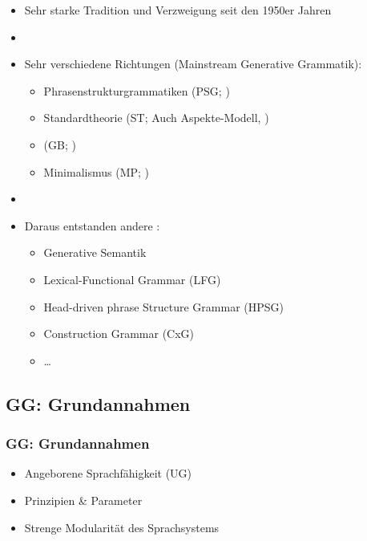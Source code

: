\begin{frame}

\begin{itemize}
	\item Sehr starke Tradition und Verzweigung seit den 1950er Jahren
	\item[]
	\item Sehr verschiedene Richtungen (Mainstream Generative Grammatik):
	\begin{itemize}
		\item Phrasenstrukturgrammatiken (PSG; \citealt{Chomsky57x})
		\item Standardtheorie (ST; Auch Aspekte-Modell, \citealt{Chomsky65a})
		\item {} (GB; \citealt{Chomsky81x})
		\item Minimalismus (MP; \citealt{Chomsky95a})
	\end{itemize}
	\item[]
	\item Daraus entstanden andere :
	\begin{itemize}
		\item Generative Semantik \citep{Harris93a}
		\item Lexical-Functional Grammar (LFG)
		\item Head-driven phrase Structure Grammar (HPSG)
		\item Construction Grammar (CxG)
		\item \dots
	\end{itemize}
\end{itemize}

\citep[vgl.][]{MuellerS15b}

\end{frame}


\subsection{GG: Grundannahmen}


\begin{frame}
\frametitle{GG: Grundannahmen}

\begin{itemize}
	\item Angeborene Sprachfähigkeit (UG)
	\item Prinzipien \& Parameter
	\item Strenge Modularität des Sprachsystems 
\end{itemize}

\end{frame}

